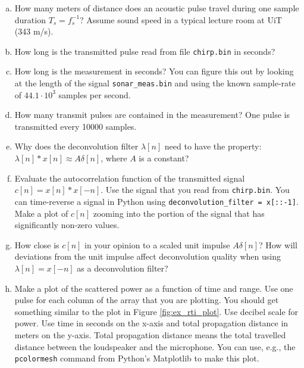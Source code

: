 \begin{enumerate}[a)]
  \item How many meters of distance does an acoustic pulse travel during one sample duration $T_s = f_s^{-1}$? 
        Assume sound speed in a typical lecture room at UiT (343 m/s).

  \item How long is the transmitted pulse read from file \verb|chirp.bin| in seconds?  

  \item How long is the measurement in seconds? You can figure this out by looking at the length of 
        the signal \verb|sonar_meas.bin| and using the known sample-rate of $44.1 \cdot 10^3$ samples per second.
    
  \item How many transmit pulses are contained in the measurement? One
        pulse is transmitted every 10000 samples.
    
  \item Why does the deconvolution filter $\lambda[n]$ need to have the
        property: $\lambda[n]*x[n] \approx A\delta[n]$, where $A$ is a constant?
   
  \item Evaluate the autocorrelation function of the transmitted signal
        $c[n]=x[n]*x[-n]$. Use the signal that you read from
        \verb|chirp.bin|. You can time-reverse a signal in Python using
        \verb|deconvolution_filter = x[::-1]|. Make a plot of $c[n]$
        zooming into the portion of the signal that has significantly
        non-zero values.

  \item How close is $c[n]$ in your opinion to a scaled unit
        impulse $A\delta[n]$? How will deviations from the unit impulse
        affect deconvolution quality when using $\lambda[n]=x[-n]$ as a
        deconvolution filter?

  \item Make a plot of the scattered power as a function of time and
        range. Use one pulse for each column of the array that you are
        plotting.  You should get something similar to the plot in Figure
        \ref{fig:ex_rti_plot}. Use decibel scale for power. Use time in
        seconds on the x-axis and total propagation distance in meters on
        the y-axis. Total propagation distance means the total travelled
        distance between the loudspeaker and the microphone. You can use,
        e.g., the \verb|pcolormesh| command from Python's Matplotlib to
        make this plot.


\end{enumerate}
